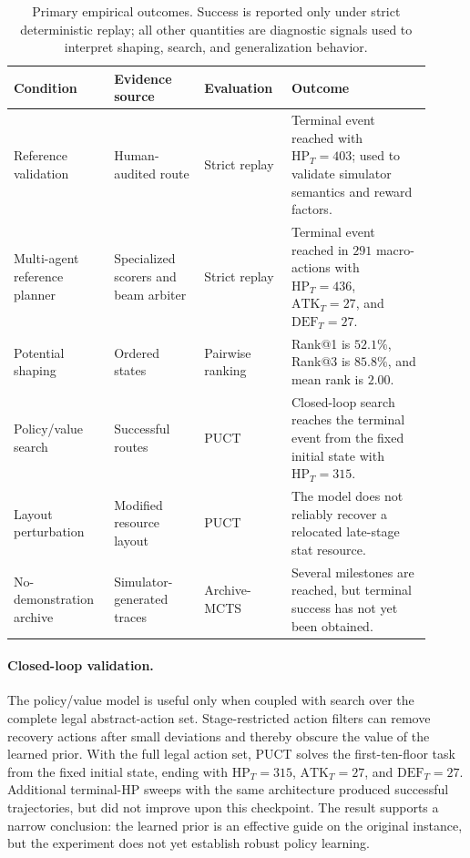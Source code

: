 \documentclass{article}
\begin{document}
\begin{table}[t]
\centering
\small
\begin{tabular}{@{}L{0.22\linewidth}L{0.20\linewidth}L{0.18\linewidth}L{0.31\linewidth}@{}}
\toprule
Condition & Evidence source & Evaluation & Outcome\\
\midrule
Reference validation & Human-audited route & Strict replay & Terminal event reached with \(\mathrm{HP}_T=403\); used to validate simulator semantics and reward factors.\\
Multi-agent reference planner & Specialized scorers and beam arbiter & Strict replay & Terminal event reached in \(291\) macro-actions with \(\mathrm{HP}_T=436\), \(\mathrm{ATK}_T=27\), and \(\mathrm{DEF}_T=27\).\\
Potential shaping & Ordered states & Pairwise ranking & Rank@1 is \(52.1\%\), Rank@3 is \(85.8\%\), and mean rank is \(2.00\).\\
Policy/value search & Successful routes & PUCT & Closed-loop search reaches the terminal event from the fixed initial state with \(\mathrm{HP}_T=315\).\\
Layout perturbation & Modified resource layout & PUCT & The model does not reliably recover a relocated late-stage stat resource.\\
No-demonstration archive & Simulator-generated traces & Archive-MCTS & Several milestones are reached, but terminal success has not yet been obtained.\\
\bottomrule
\end{tabular}
\caption{Primary empirical outcomes.  Success is reported only under strict
deterministic replay; all other quantities are diagnostic signals used to
interpret shaping, search, and generalization behavior.}
\label{tab:result-summary}
\end{table}

\paragraph{Closed-loop validation.}
The policy/value model is useful only when coupled with search over the complete
legal abstract-action set.  Stage-restricted action filters can remove recovery
actions after small deviations and thereby obscure the value of the learned
prior.  With the full legal action set, PUCT solves the first-ten-floor task from
the fixed initial state, ending with \(\mathrm{HP}_T=315\),
\(\mathrm{ATK}_T=27\), and \(\mathrm{DEF}_T=27\).
Additional terminal-HP sweeps with the same architecture produced successful
trajectories, but did not improve upon this checkpoint.  The result supports a
narrow conclusion: the learned prior is an effective guide on the original
instance, but the experiment does not yet establish robust policy learning.
\end{document}
